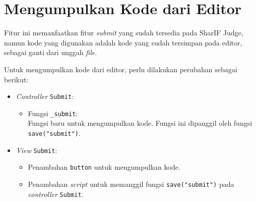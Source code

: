 \section{Mengumpulkan Kode dari Editor}
\label{sec:4:kumpul}

Fitur ini memanfaatkan fitur \textit{submit} yang sudah tersedia pada SharIF Judge, namun kode yang digunakan adalah kode yang sudah tersimpan pada editor, sebagai ganti dari unggah \textit{file}. 

Untuk mengumpulkan kode dari editor, perlu dilakukan perubahan sebagai berikut:
\begin{itemize}
	\item \textit{Controller} \verb|Submit|:
    \begin{itemize}
		\item Fungsi \verb|_submit|: \\ Fungsi baru untuk mengumpulkan kode. Fungsi ini dipanggil oleh fungsi \verb|save("submit")|.
    \end{itemize}
    \item \textit{View} \verb|Submit|:
    \begin{itemize}
        \item Penambahan \verb|button| untuk mengumpulkan kode.
        \item Penambahan \textit{script} untuk memanggil fungsi \verb|save("submit")| pada \textit{controller} \verb|Submit|. 
    \end{itemize}
\end{itemize}
